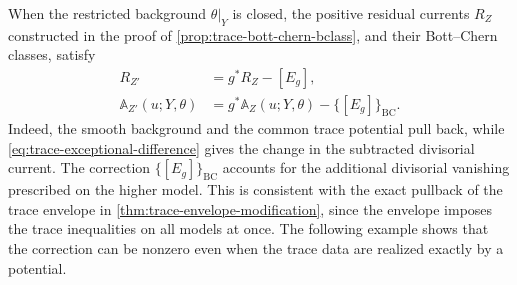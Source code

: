 When the restricted background $\theta|_Y$ is closed, the positive residual currents $R_Z$ constructed in the proof of \cref{prop:trace-bott-chern-bclass}, and their Bott--Chern classes, satisfy
\[
 \begin{split}
 R_{Z'}&=g^*R_Z-[E_g],\\
 \mathbb A_{Z'}(u;Y,\theta)
       &=g^*\mathbb A_Z(u;Y,\theta)-\{[E_g]\}_{\mathrm{BC}}.
 \end{split}
\]
Indeed, the smooth background and the common trace potential pull back, while \eqref{eq:trace-exceptional-difference} gives the change in the subtracted divisorial current. The correction $\{[E_g]\}_{\mathrm{BC}}$ accounts for the additional divisorial vanishing prescribed on the higher model. This is consistent with the exact pullback of the trace envelope in \cref{thm:trace-envelope-modification}, since the envelope imposes the trace inequalities on all models at once. The following example shows that the correction can be nonzero even when the trace data are realized exactly by a potential.

